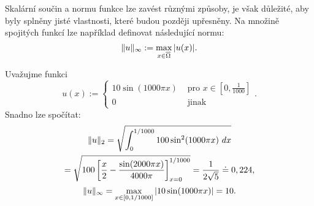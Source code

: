 

Skalární součin a normu funkce lze zavést různými způsoby, je však důležité, aby byly splněny jisté vlastnosti, které budou později upřesněny.
Na množině spojitých funkcí lze například definovat následující normu:
\[ \|u\|_\infty := \max_{x\in\overline\Omega}|u(x)|. \]

\begin{ex}
Uvažujme funkci
\[ u(x):=\begin{cases}10\sin(1000\pi x) & \mbox{ pro }x\in[0,\frac1{1000}]\\0 & \mbox{ jinak}\end{cases}. \]
Snadno lze spočítat:
\begin{multline*}
\|u\|_2 = \sqrt{\int_0^{1/1000}100\sin^2(1000\pi x)~dx}\\
= \sqrt{100\left[\frac{x}2-\frac{\sin(2000\pi x)}{4000\pi}\right]_{x=0}^{1/1000}}
= \frac1{2\sqrt{5}}\doteq 0,224,
\end{multline*}
\[ \|u\|_\infty = \max_{x\in[0,1/1000]}|10\sin(1000\pi x)| = 10. \]
\end{ex}

